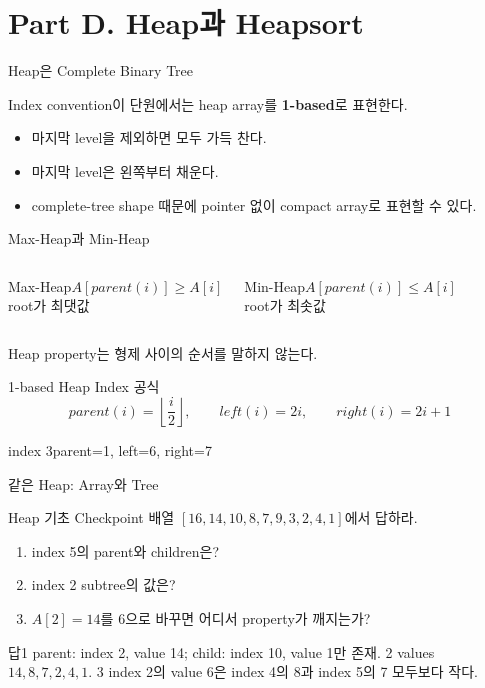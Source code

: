 \section{Part D. Heap과 Heapsort}
\begin{frame}{Heap은 Complete Binary Tree}
\begin{alertblock}{Index convention}이 단원에서는 heap array를 \textbf{1-based}로 표현한다.\end{alertblock}
\begin{itemize}\item 마지막 level을 제외하면 모두 가득 찬다.\item 마지막 level은 왼쪽부터 채운다.\item complete-tree shape 때문에 pointer 없이 compact array로 표현할 수 있다.\end{itemize}
\end{frame}
\begin{frame}{Max-Heap과 Min-Heap}
\begin{columns}[T]\begin{block}{Max-Heap}$A[parent(i)]\ge A[i]$\\root가 최댓값\end{block}\begin{block}{Min-Heap}$A[parent(i)]\le A[i]$\\root가 최솟값\end{block}\end{columns}
\vspace{5mm}\centering Heap property는 형제 사이의 순서를 말하지 않는다.
\end{frame}
\begin{frame}{1-based Heap Index 공식}
\[parent(i)=\left\lfloor\frac{i}{2}\right\rfloor,\qquad left(i)=2i,\qquad right(i)=2i+1\]
\begin{exampleblock}{index 3}parent=1, left=6, right=7\end{exampleblock}
\end{frame}
\begin{frame}{같은 Heap: Array와 Tree}
\centering{}
\end{frame}
\begin{frame}{Heap 기초 Checkpoint}
배열 $[16,14,10,8,7,9,3,2,4,1]$에서 답하라.
\begin{enumerate}\item index 5의 parent와 children은?\item index 2 subtree의 값은?\item $A[2]=14$를 6으로 바꾸면 어디서 property가 깨지는가?\end{enumerate}
\begin{exampleblock}{답}1 parent: index 2, value 14; child: index 10, value 1만 존재. 2 values $14,8,7,2,4,1$. 3 index 2의 value 6은 index 4의 8과 index 5의 7 모두보다 작다.\end{exampleblock}
\end{frame}
